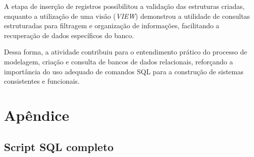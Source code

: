 \documentclass[12pt,a4paper]{article}
\begin{document}
A etapa de inserção de registros possibilitou a validação das estruturas criadas, enquanto a utilização de uma visão (\textit{VIEW}) demonstrou a utilidade de consultas estruturadas para filtragem e organização de informações, facilitando a recuperação de dados específicos do banco.

Dessa forma, a atividade contribuiu para o entendimento prático do processo de modelagem, criação e consulta de bancos de dados relacionais, reforçando a importância do uso adequado de comandos SQL para a construção de sistemas consistentes e funcionais.

\section{Apêndice}

\subsection{Script SQL completo}


\end{document}

